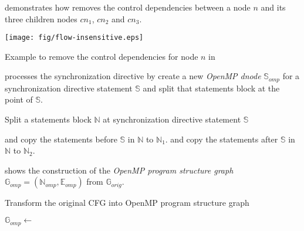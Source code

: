  demonstrates how  removes the control dependencies between a node $n$ and its three children nodes $cn_1$, $cn_2$ and $cn_3$. 
\begin{center-figure}
	\texttt{[image: fig/flow-insensitive.eps]}
	\caption{Example to remove the control dependencies for node $n$ in }
	\label{fig:flow-insensitive-example}
\end{center-figure}

 processes the synchronization directive by create a new \textit{OpenMP dnode} $\mathbb{S}_{omp}$ for a synchronization directive statement $\mathbb{S}$ and split that statements block at the point of $\mathbb{S}$.
\begin{algorithm}
	\caption{Split a statements block $\mathbb{N}$ at synchronization directive statement $\mathbb{S}$}
	\label{a:split-synch-directive-pseudocode}
	\begin{algorithmic}[1]
			\State {} and copy the statements before $\mathbb{S}$ in $\mathbb{N}$ to $\mathbb{N}_1$.
			\State {} 
			\State {} and copy the statements after $\mathbb{S}$ in $\mathbb{N}$ to $\mathbb{N}_2$.
			\State {}
			\State {}
			\State {}
			\State {}
			\State {}
		\EndProcedure
	\end{algorithmic}
\end{algorithm}

 shows the construction of the \textit{OpenMP program structure graph} $\mathbb{G}_{omp} = (\mathbb{N}_{omp}, \mathbb{E}_{omp})$ from $\mathbb{G}_{orig}$.
\begin{algorithm}
	\caption{Transform the original CFG into OpenMP program structure graph}
	\label{a:OpenMP-program-structure-graph-pseudocode}
	\begin{algorithmic}[1]
		\State $\mathbb{G}_{omp} \gets$ 
				\State {}
			\EndWhile
		\EndFor
			\State {}
		\EndFor
		\State {}
	\end{algorithmic}
\end{algorithm}

